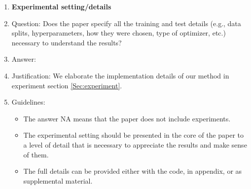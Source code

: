 \documentclass{article}
\begin{document}
\begin{enumerate}
\item {\bf Experimental setting/details}
    \item[] Question: Does the paper specify all the training and test details (e.g., data splits, hyperparameters, how they were chosen, type of optimizer, etc.) necessary to understand the results?
    \item[] Answer: \answerYes{} %
    \item[] Justification: We elaborate the implementation details of our method in experiment section \ref{Sec:experiment}.
    \item[] Guidelines:
    \begin{itemize}
        \item The answer NA means that the paper does not include experiments.
        \item The experimental setting should be presented in the core of the paper to a level of detail that is necessary to appreciate the results and make sense of them.
        \item The full details can be provided either with the code, in appendix, or as supplemental material.
    \end{itemize}


\end{enumerate}
\end{document}
